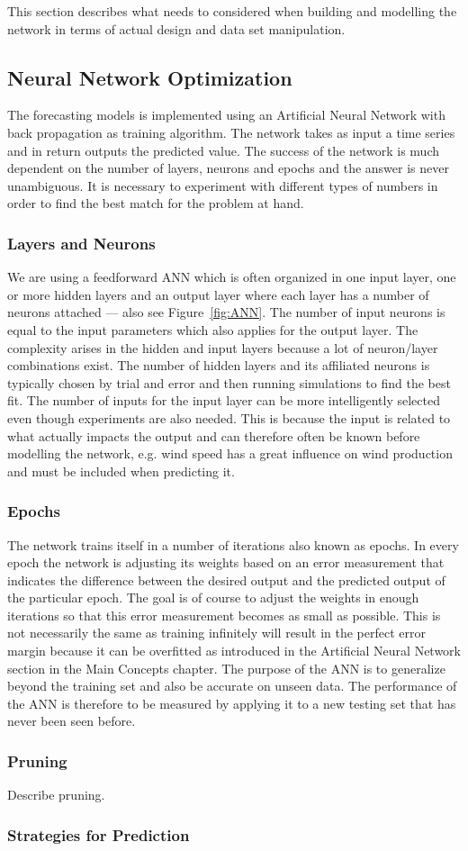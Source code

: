 This section describes what needs to considered when building and modelling the network in terms of actual design and data set manipulation.

\subsection{Neural Network Optimization}
The forecasting models is implemented using an Artificial Neural Network with back propagation as training algorithm. The network takes as input a time series and in return outputs the predicted value. The success of the network is much dependent on the number of layers, neurons and epochs and the answer is never unambiguous. It is necessary to experiment with different types of numbers in order to find the best match for the problem at hand.

\subsubsection{Layers and Neurons}
We are using a feedforward ANN which is often organized in one input layer, one or more hidden layers and an output layer where each layer has a number of neurons attached\cite{1} --- also see Figure~\ref{fig:ANN}. The number of input neurons is equal to the input parameters which also applies for the output layer. 
The complexity arises in the hidden and input layers because a lot of neuron/layer combinations exist. The number of hidden layers and its affiliated neurons is typically chosen by trial and error and then running simulations to find the best fit\cite{1}. The number of inputs for the input layer can be more intelligently selected even though experiments are also needed. This is because the input is related to what actually impacts the output and can therefore often be known before modelling the network, e.g. wind speed has a great influence on wind production and must be included when predicting it.

\subsubsection{Epochs}
The network trains itself in a number of iterations also known as epochs. In every epoch the network is adjusting its weights based on an error measurement that indicates the difference between the desired output and the predicted output of the particular epoch\cite{1}. The goal is of course to adjust the weights in enough iterations so that this error measurement becomes as small as possible. This is not necessarily the same as training infinitely will result in the perfect error margin because it can be overfitted as introduced in the Artificial Neural Network section in the Main Concepts chapter. The purpose of the ANN is to generalize beyond the training set and also be accurate on unseen data\cite{1}. The performance of the ANN is therefore to be measured by applying it to a new testing set that has never been seen before.

\subsubsection{Pruning}
Describe pruning.

\subsubsection{Strategies for Prediction}
